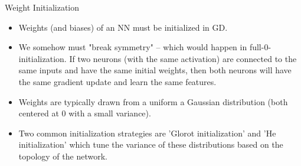 \documentclass[11pt,compress,t,notes=noshow, xcolor=table]{beamer}
\begin{document}
\begin{vbframe}{Weight Initialization}
\begin{itemize}
\item Weights (and biases) of an NN must be initialized in GD.
\item We somehow must "break symmetry" -- which would happen in full-0-initialization.
    If two neurons (with the same activation) are connected to the same inputs and have the same initial weights, then both neurons will have the same gradient update and learn the same features.
\item Weights are typically drawn from a uniform a Gaussian distribution (both centered at 0 with a small variance).
\item Two common initialization strategies are ’Glorot initialization’ and ’He initialization’ which tune the variance of these distributions based on the topology of the network.
\end{itemize}
\end{vbframe}


\end{document}
